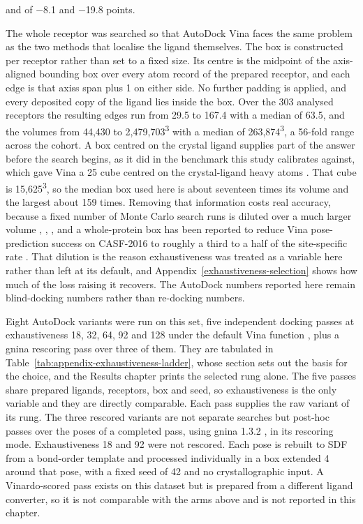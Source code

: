 and of \ensuremath{-}8.1 and \ensuremath{-}19.8 points.

The whole receptor was searched so that AutoDock Vina faces the same problem as the two methods that localise the ligand themselves. The box is constructed per receptor rather than set to a fixed size. Its centre is the midpoint of the axis-aligned bounding box over every atom record of the prepared receptor, and each edge is that axis\textquotesingle s span plus 1\angstrom{} on either side. No further padding is applied, and every deposited copy of the ligand lies inside the box. Over the 303 analysed receptors the resulting edges run from 29.5 to 167.4\angstrom{} with a median of 63.5\angstrom{}, and the volumes from 44,430 to 2,479,703\angstrom{}\textsuperscript{3} with a median of 263,874\angstrom{}\textsuperscript{3}, a 56-fold range across the cohort. A box centred on the crystal ligand supplies part of the answer before the search begins, as it did in the benchmark this study calibrates against, which gave Vina a 25\angstrom{} cube centred on the crystal-ligand heavy atoms \cite{ref035}. That cube is 15,625\angstrom{}\textsuperscript{3}, so the median box used here is about seventeen times its volume and the largest about 159 times. Removing that information costs real accuracy, because a fixed number of Monte Carlo search runs is diluted over a much larger volume \cite{ref079}, \cite{ref080}, \cite{ref081}, and a whole-protein box has been reported to reduce Vina pose-prediction success on CASF-2016 \cite{ref084} to roughly a third to a half of the site-specific rate \cite{ref082}. That dilution is the reason exhaustiveness was treated as a variable here rather than left at its default, and Appendix~\ref{exhaustiveness-selection} shows how much of the loss raising it recovers. The AutoDock numbers reported here remain blind-docking numbers rather than re-docking numbers.

Eight AutoDock variants were run on this set, five independent docking passes at exhaustiveness 18, 32, 64, 92 and 128 under the default Vina function \cite{ref023}, plus a gnina rescoring pass over three of them. They are tabulated in Table~\ref{tab:appendix-exhaustiveness-ladder}, whose section sets out the basis for the choice, and the Results chapter prints the selected rung alone. The five passes share prepared ligands, receptors, box and seed, so exhaustiveness is the only variable and they are directly comparable. Each pass supplies the raw variant of its rung. The three rescored variants are not separate searches but post-hoc passes over the poses of a completed pass, using gnina 1.3.2 \cite{ref056}, \cite{ref067} in its rescoring mode. Exhaustiveness 18 and 92 were not rescored. Each pose is rebuilt to SDF from a bond-order template and processed individually in a box extended 4\angstrom{} around that pose, with a fixed seed of 42 and no crystallographic input. A Vinardo-scored pass \cite{ref073} exists on this dataset but is prepared from a different ligand converter, so it is not comparable with the arms above and is not reported in this chapter.

